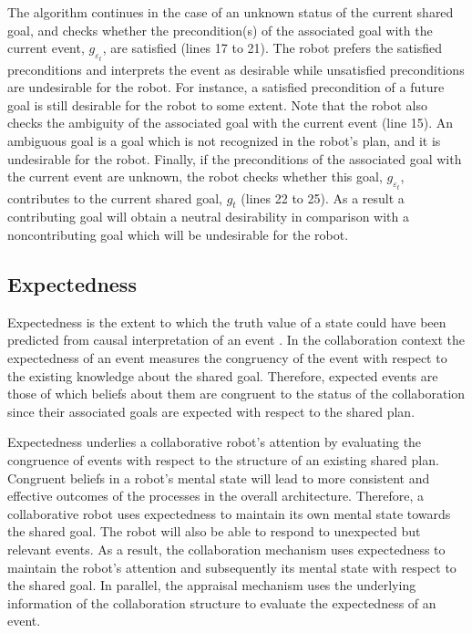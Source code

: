 \documentclass{aamas2016}
\begin{document}
The algorithm continues in the case of an unknown status of the current shared
goal, and checks whether the precondition(s) of the associated goal with the
current event, $\mathit{g}_{\varepsilon_t}$, are satisfied (lines 17 to 21).
The robot prefers the satisfied preconditions and interprets the event as
desirable while unsatisfied preconditions are undesirable for the robot. For
instance, a satisfied precondition of a future goal is still desirable for the
robot to some extent. Note that the robot also checks the ambiguity of the
associated goal with the current event (line 15). An ambiguous goal is a goal
which is not recognized in the robot's plan, and it is undesirable for the
robot. Finally, if the preconditions of the associated goal with the current
event are unknown, the robot checks whether this goal,
$\mathit{g}_{\varepsilon_t}$, contributes to the current shared goal,
$\mathit{g}_{t}$ (lines 22 to 25). As a result a contributing goal will obtain a
neutral desirability in comparison with a noncontributing goal which will be
undesirable for the robot.

\subsection{Expectedness}

Expectedness is the extent to which the truth value of a state could have been
predicted from causal interpretation of an event
\cite{marsella:ema-process-model}. In the collaboration context the expectedness
of an event measures the congruency of the event with respect to the existing
knowledge about the shared goal. Therefore, expected events are those of which
beliefs about them are congruent to the status of the collaboration since their
associated goals are expected with respect to the shared plan.

Expectedness underlies a collaborative robot's attention by evaluating the
congruence of events with respect to the structure of an existing shared plan.
Congruent beliefs in a robot's mental state will lead to more consistent and
effective outcomes of the processes in the overall architecture. Therefore,
a collaborative robot uses expectedness to maintain its own mental state towards
the shared goal. The robot will also be able to respond to unexpected but
relevant events. As a result, the collaboration mechanism uses expectedness to
maintain the robot's attention and subsequently its mental state with respect to
the shared goal. In parallel, the appraisal mechanism uses the underlying
information of the collaboration structure to evaluate the expectedness of an
event.
\end{document}
